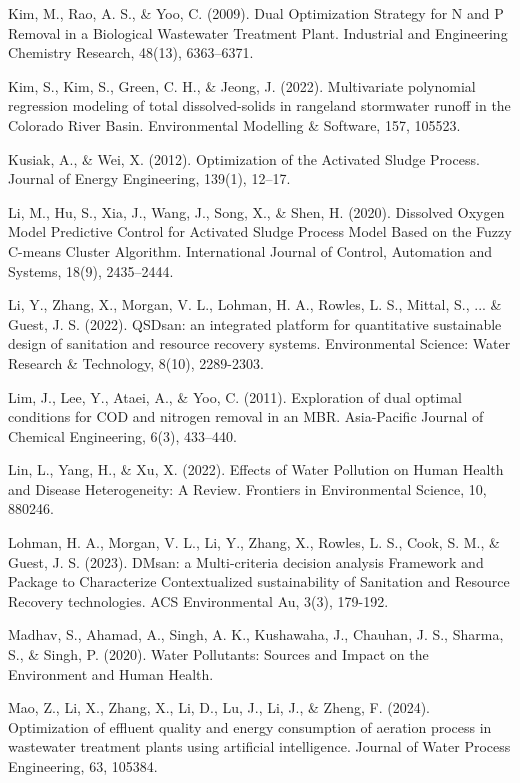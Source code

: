 \documentclass{article}
\begin{document}
Kim, M., Rao, A. S., \& Yoo, C. (2009). Dual Optimization Strategy for N and P Removal in a Biological Wastewater Treatment Plant. Industrial and Engineering Chemistry Research, 48(13), 6363–6371.

Kim, S., Kim, S., Green, C. H., \& Jeong, J. (2022). Multivariate polynomial regression modeling of total dissolved-solids in rangeland stormwater runoff in the Colorado River Basin. Environmental Modelling \& Software, 157, 105523.

Kusiak, A., \& Wei, X. (2012). Optimization of the Activated Sludge Process. Journal of Energy Engineering, 139(1), 12–17.

Li, M., Hu, S., Xia, J., Wang, J., Song, X., \& Shen, H. (2020). Dissolved Oxygen Model Predictive Control for Activated Sludge Process Model Based on the Fuzzy C-means Cluster Algorithm. International Journal of Control, Automation and Systems, 18(9), 2435–2444.

Li, Y., Zhang, X., Morgan, V. L., Lohman, H. A., Rowles, L. S., Mittal, S., ... \& Guest, J. S. (2022). QSDsan: an integrated platform for quantitative sustainable design of sanitation and resource recovery systems. Environmental Science: Water Research \& Technology, 8(10), 2289-2303.

Lim, J., Lee, Y., Ataei, A., \& Yoo, C. (2011). Exploration of dual optimal conditions for COD and nitrogen removal in an MBR. Asia-Pacific Journal of Chemical Engineering, 6(3), 433–440.

Lin, L., Yang, H., \& Xu, X. (2022). Effects of Water Pollution on Human Health and Disease Heterogeneity: A Review. Frontiers in Environmental Science, 10, 880246.

Lohman, H. A., Morgan, V. L., Li, Y., Zhang, X., Rowles, L. S., Cook, S. M., \& Guest, J. S. (2023). DMsan: a Multi-criteria decision analysis Framework and Package to Characterize Contextualized sustainability of Sanitation and Resource Recovery technologies. ACS Environmental Au, 3(3), 179-192.

Madhav, S., Ahamad, A., Singh, A. K., Kushawaha, J., Chauhan, J. S., Sharma, S., \& Singh, P. (2020). Water Pollutants: Sources and Impact on the Environment and Human Health.

Mao, Z., Li, X., Zhang, X., Li, D., Lu, J., Li, J., \& Zheng, F. (2024). Optimization of effluent quality and energy consumption of aeration process in wastewater treatment plants using artificial intelligence. Journal of Water Process Engineering, 63, 105384.
\end{document}
